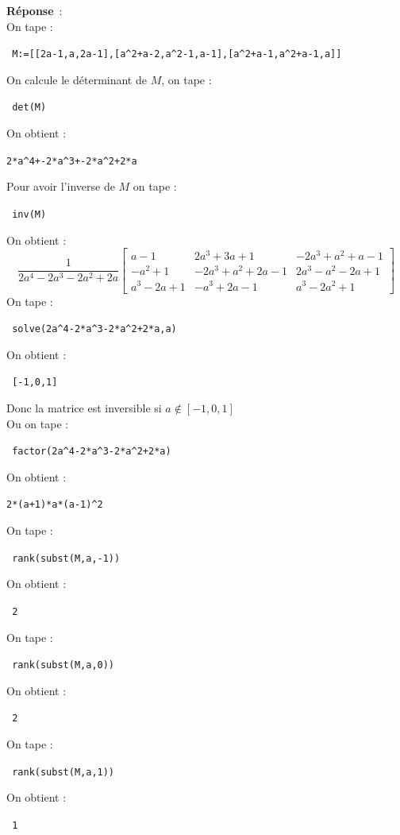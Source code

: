 \documentclass{article}
\begin{document}
\begin{giacjshere}
\begin{enumerate}
{\bf R\'eponse}~:\\
On tape :
\begin{center}
 \verb| M:=[[2a-1,a,2a-1],[a^2+a-2,a^2-1,a-1],[a^2+a-1,a^2+a-1,a]] |
\end{center}
On calcule le d\'eterminant de $M$, on tape :
\begin{center}
\verb| det(M)|
\end{center}
On obtient :
\begin{center}\verb|2*a^4+-2*a^3+-2*a^2+2*a|\end{center}
Pour avoir l'inverse de $M$ on tape :
\begin{center}
\verb| inv(M)|
\end{center}
On obtient :
$$ \frac{1}{2a^4-2a^3-2a^2+2a}\left[
\begin{array}{ccc}
a-1 & 2a^3+3a+1 & -2a^3+a^2+a-1\\
-a^2+1 & -2a^3+a^2+2a-1 & 2a^3-a^2-2a+1\\
a^3-2a+1 & -a^3+2a-1 & a^3-2a^2+1
\end{array}
\right] $$
On tape :
\begin{center}
\verb| solve(2a^4-2*a^3-2*a^2+2*a,a)|
\end{center}
On obtient :
\begin{center}\verb| [-1,0,1]|\end{center}
Donc la matrice est inversible si $a \not\in [-1,0,1]$\\
Ou on tape :
\begin{center}
\verb| factor(2a^4-2*a^3-2*a^2+2*a)|
\end{center}
On obtient :
\begin{center}\verb|2*(a+1)*a*(a-1)^2|\end{center}
On tape :
\begin{center}
\verb| rank(subst(M,a,-1))|
\end{center}
On obtient :
\begin{center}
\verb| 2|
\end{center}
On tape :
\begin{center}
\verb| rank(subst(M,a,0))|
\end{center}
On obtient :
\begin{center}
\verb| 2|
\end{center}
On tape :
\begin{center}
\verb| rank(subst(M,a,1))|
\end{center}
On obtient :
\begin{center}
\verb| 1|
\end{center}

\end{enumerate}
\end{giacjshere}
\end{document}
